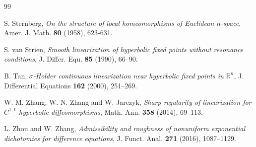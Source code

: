 \documentclass[reqno, a4paper, 10pt]{amsart}
\theoremstyle{plain}
\numberwithin{equation}{section}
\theoremstyle{remark}
\begin{document}
\begin{thebibliography}{99}
 
 S. Sternberg, \emph{On the structure of local homeomorphisms of Euclidean $n$-space},  Amer. J. Math. \textbf{80} (1958), 623-631.
 
  S. van Strien, {\it Smooth linearization of hyperbolic fixed points without resonance conditions}, J. Differ. Equ. {\bf 85} (1990), 66--90.

 B. Tan, \emph{$\sigma$-Holder continuous linearization near hyperbolic fixed points in $\mathbb R^n$}, J. Differential Equations \textbf{162} (2000), 251--269.
 
  W. M. Zhang, W. N. Zhang and W. Jarczyk, {\it Sharp regularity of linearization for $C^{1, 1}$
hyperbolic diffeomorphisms}, Math. Ann. {\bf 358} (2014), 69--113.

 L. Zhou and W. Zhang, \emph{Admissibility and roughness of nonuniform exponential dichotomies for difference equations}, J. Funct. Anal. \textbf{271} (2016), 1087--1129.




\end{thebibliography}
\end{document}
